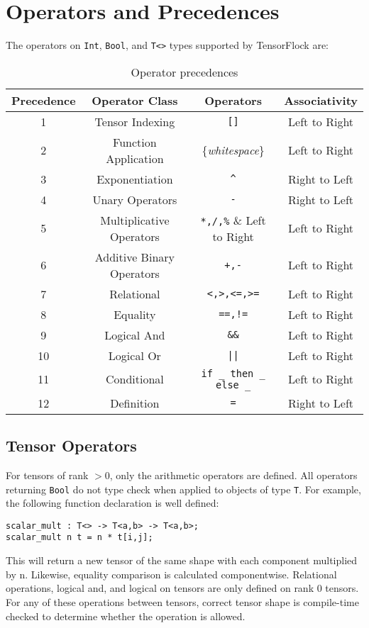 \section{Operators and Precedences}%
\label{sec:operators_and_precedences}

The operators on \verb|Int|, \verb|Bool|, and \verb|T<>| types
supported by TensorFlock are:

\begin{table}[htpb]
    \centering
    \caption{Operator precedences}
    \label{tab:label}
\begin{tabular}{ |c|c|c|c| } 
 \hline
 Precedence & Operator Class & Operators & Associativity\\ 
 \hline
 1 & Tensor Indexing & \verb|[]| & Left to Right\\
 \hline
 2 & Function Application & \{\textit{whitespace}\} & Left to Right \\
 \hline
 3 & Exponentiation & \verb|^| & Right to Left\\
 \hline
 4 & Unary Operators & \verb|-| & Right to Left \\
 \hline
 5 & Multiplicative Operators & \verb|*,/,%| & Left to Right\\
 \hline
 6 & Additive Binary Operators & \verb|+,-| & Left to Right\\
 \hline
 7 & Relational & \verb|<,>,<=,>=| & Left to Right\\
 \hline
 8 & Equality & \verb|==,!=| & Left to Right\\
 \hline
 9 & Logical And & \verb|&&| & Left to Right\\
 \hline
 10 & Logical Or & \verb!||! & Left to Right\\
 \hline
 11 & Conditional & \verb!if _ then _ else _! & Left to Right\\
 \hline
 12 & Definition & \verb|=| & Right to Left\\
 \hline
\end{tabular}
    
\end{table}
\begin{center}
\end{center}

\subsection{Tensor Operators}
For tensors of rank $> 0$, only the arithmetic operators are defined. All
operators returning \verb|Bool| do not type check when applied to objects of
type \verb|T|.
For example, the following function declaration is well defined:
\begin{lstlisting}
scalar_mult : T<> -> T<a,b> -> T<a,b>;
scalar_mult n t = n * t[i,j];
\end{lstlisting}
This will return a new tensor of the same shape with each component multiplied
by n. Likewise, equality comparison is calculated componentwise. Relational
operations, logical and, and logical on tensors are only defined on rank
0 tensors.  For any of these operations between tensors, correct tensor shape is
compile-time checked to determine whether the operation is allowed.

